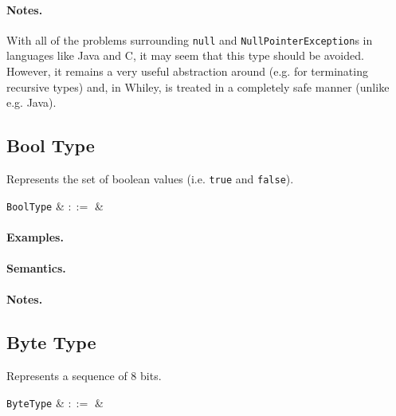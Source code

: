 \paragraph{Notes.}  With all of the problems surrounding \lstinline{null} and \lstinline{NullPointerException}s in languages like Java and C, it may seem that this type should be avoided. However, it remains a very useful abstraction around (e.g. for terminating recursive types) and, in Whiley, is treated in a completely safe manner (unlike e.g. Java).


\subsection{Bool Type}

Represents the set of boolean values (i.e. \lstinline{true} and \lstinline{false}).

\begin{syntax}
 \verb+BoolType+ & $::=$ &  \\
\end{syntax}

\paragraph{Examples.}

\paragraph{Semantics.}

\paragraph{Notes.} 


\subsection{Byte Type}

Represents a sequence of 8 bits. 

\begin{syntax}
 \verb+ByteType+ & $::=$ &  \\
\end{syntax}

